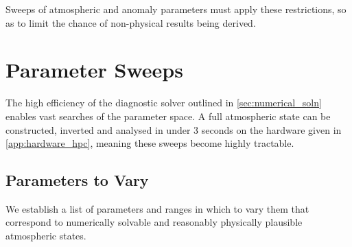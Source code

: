 \documentclass{article}
\begin{document}
Sweeps of atmospheric and anomaly parameters must apply these restrictions, so as to limit the chance of non-physical results being derived.

\section{Parameter Sweeps}
The high efficiency of the diagnostic solver outlined in \cref{sec:numerical_soln} enables vast searches of the parameter space.
A full atmospheric state can be constructed, inverted and analysed in under 3 seconds on the hardware given in \cref{app:hardware_hpc}, meaning these sweeps become highly tractable.

\subsection{Parameters to Vary}
We establish a list of parameters and ranges in which to vary them that correspond to numerically solvable and reasonably physically plausible atmospheric states.

\providecommand{\rowsep}{%
  \arrayrulecolor{black!20}\specialrule{0.4pt}{4pt}{4pt}\arrayrulecolor{black}}
\providecommand{\paramgroup}[1]{%
  \multicolumn{5}{@{}l}{\textbf{#1}}\\[2pt]}
 
\end{document}

